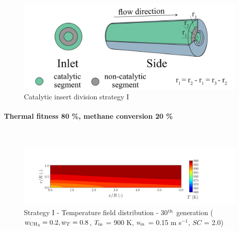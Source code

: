 \documentclass[preprint,12pt]{elsarticle}
\begin{document}
\begin{figure}[h!]
\centering
\includegraphics[width=120mm]{5seg.png}
\caption{\label{fig:5seg}Catalytic insert division strategy I}
\end{figure}

\paragraph{Thermal fitness 80 \%, methane conversion 20 \%} \hspace{0pt} \\
\noindent 

%

\begin{figure}[h!]
\centering
\includegraphics[width=190mm]{results/5/20C_80T/GEN30-TFIELD.png}
\caption{\label{fig:5R2080G30-TField} Strategy I - Temperature field distribution - 30$^{\rm{th}}$ generation ($w_{\rm{CH_4}} = 0.2, w_T = 0.8$, $T_{\rm{in}}$ = 900 K, $u_{\rm{in}}$ = 0.15 m s$^{-1}$, $SC$ = 2.0)}
\end{figure}
\end{document}
